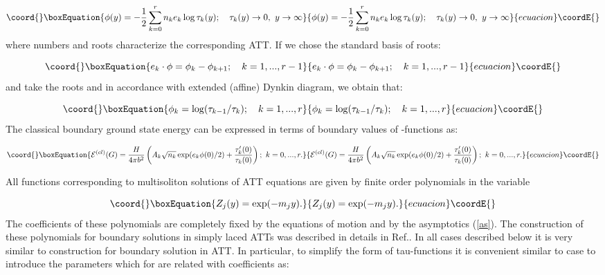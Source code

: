 \documentclass[a4paper,12pt,titlepage,final]{article}
\begin{document}
\begin{equation}\coord{}\boxEquation{
\phi (y)=-\frac{1}{2}\sum_{k=0}^{r}n_{k}e_{k}\log \tau _{k}(y);\quad \tau
_{k}(y)\rightarrow 0,~y\rightarrow \infty  \label{t}
}{
\phi (y)=-\frac{1}{2}\sum_{k=0}^{r}n_{k}e_{k}\log \tau _{k}(y);\quad \tau
_{k}(y)\rightarrow 0,~y\rightarrow \infty  }{ecuacion}\coordE{}\end{equation}
where numbers \coordHE{} and roots \coordHE{} characterize the corresponding ATT.
If we chose the standard basis of roots:

\begin{equation}\coord{}\boxEquation{
e_{k}\cdot \phi =\phi _{k}-\phi _{k+1};\quad k=1,...,r-1  \label{SB}
}{
e_{k}\cdot \phi =\phi _{k}-\phi _{k+1};\quad k=1,...,r-1  }{ecuacion}\coordE{}\end{equation}
and take the roots \coordHE{} and \coordHE{} in accordance with extended (affine)
Dynkin diagram, we obtain that:

\begin{equation}\coord{}\boxEquation{
\phi _{k}=\log (\tau _{k-1}/\tau _{k});\quad k=1,...,r  \label{fii}
}{
\phi _{k}=\log (\tau _{k-1}/\tau _{k});\quad k=1,...,r  }{ecuacion}\coordE{}\end{equation}
The classical boundary ground state energy can be expressed in terms of
boundary values of \myHighlight{$\tau $}\coordHE{}-functions \cite{BOWC} as:

\begin{equation}\coord{}\boxEquation{
\mathcal{E}^{(cl)}(G)=\frac{H}{4\pi b^{2}}\left( A_{k}\sqrt{n_{k}}\exp
(e_{k}\phi (0)/2)+\frac{\tau _{k}^{\prime }(0)}{\tau _{k}(0)}\right)
;~k=0,...,r.  \label{en}
}{
\mathcal{E}^{(cl)}(G)=\frac{H}{4\pi b^{2}}\left( A_{k}\sqrt{n_{k}}\exp
(e_{k}\phi (0)/2)+\frac{\tau _{k}^{\prime }(0)}{\tau _{k}(0)}\right)
;~k=0,...,r.  }{ecuacion}\coordE{}\end{equation}

All functions \coordHE{} corresponding to multisoliton solutions of ATT
equations are given by finite order polynomials in the variable

\begin{equation}\coord{}\boxEquation{
Z_{j}(y)=\exp (-m_{j}y).  \label{Z}
}{
Z_{j}(y)=\exp (-m_{j}y).  }{ecuacion}\coordE{}\end{equation}
The coefficients of these polynomials are completely fixed by the equations
of motion and by the asymptotics (\ref{as}). The construction of these
polynomials for boundary solutions in simply laced ATTs was described in
details in Ref.\cite{FO}. In all cases described below it is very similar to
construction for boundary solution in \coordHE{} ATT. In particular, to
simplify the form of tau-functions it is convenient similar to \coordHE{} case
to introduce the parameters \coordHE{} which for \coordHE{} are related with
coefficients \coordHE{} as:
\end{document}
